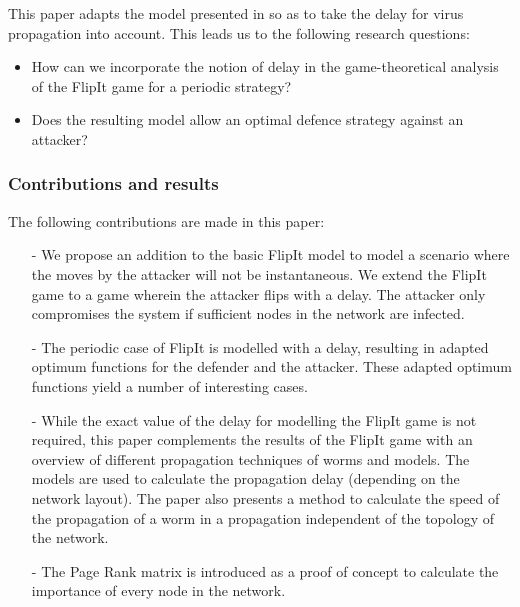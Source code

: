 This paper adapts the model presented in \cite{FlipIt} so as to take the delay for virus propagation into account.
This leads us to the following research questions:
\begin{itemize}
\item How can we incorporate the notion of delay in the game-theoretical analysis of the FlipIt game for a periodic strategy?
\item Does the resulting model allow an optimal defence strategy against an attacker? 
\end{itemize}

\subsubsection{Contributions and results}
The following contributions are made in this paper:
\begin{itemize}
\item[-] We propose an addition to the basic FlipIt model to model a scenario where the moves by the attacker will not be instantaneous. We extend the FlipIt game to a game wherein the attacker flips with a delay. The attacker only compromises the system if sufficient nodes in the network are infected. 
\item[-] The periodic case of FlipIt is modelled with a delay, resulting in adapted optimum functions for the defender and the attacker. These adapted optimum functions yield a number of interesting cases.
\item[-] While the exact value of the delay for modelling the FlipIt game is not required, this paper complements the results of the FlipIt game with an overview of different propagation techniques of worms and models. The models are used to calculate the propagation delay (depending on the network layout). The paper also presents a method to calculate the speed of the propagation of a worm in a propagation independent of the topology of the network.
\item[-] The Page Rank matrix is introduced as a proof of concept to calculate the importance of every node in the network.
\end{itemize}


